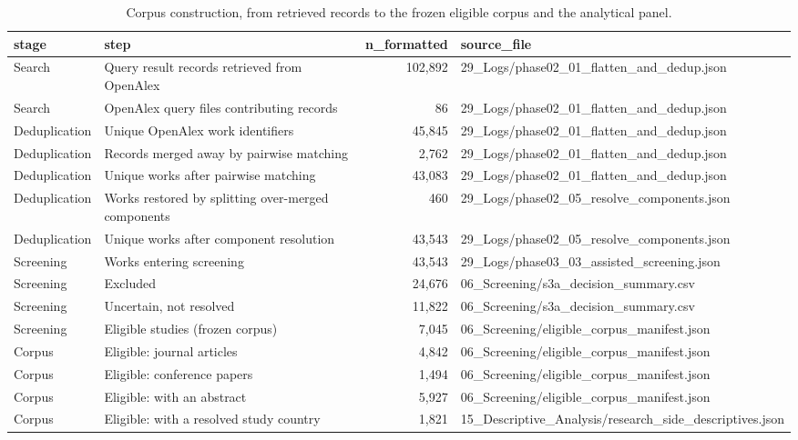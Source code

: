 \begin{table}[htbp]
\centering
\small
\caption{Corpus construction, from retrieved records to the frozen eligible corpus and the analytical panel.}
\label{tab:tab_01_corpus_construction}
\begin{tabular}{llrl}
\toprule
stage & step & n\_formatted & source\_file \\
\midrule
Search & Query result records retrieved from OpenAlex & 102,892 & 29\_Logs/phase02\_01\_flatten\_and\_dedup.json \\
Search & OpenAlex query files contributing records & 86 & 29\_Logs/phase02\_01\_flatten\_and\_dedup.json \\
Deduplication & Unique OpenAlex work identifiers & 45,845 & 29\_Logs/phase02\_01\_flatten\_and\_dedup.json \\
Deduplication & Records merged away by pairwise matching & 2,762 & 29\_Logs/phase02\_01\_flatten\_and\_dedup.json \\
Deduplication & Unique works after pairwise matching & 43,083 & 29\_Logs/phase02\_01\_flatten\_and\_dedup.json \\
Deduplication & Works restored by splitting over-merged components & 460 & 29\_Logs/phase02\_05\_resolve\_components.json \\
Deduplication & Unique works after component resolution & 43,543 & 29\_Logs/phase02\_05\_resolve\_components.json \\
Screening & Works entering screening & 43,543 & 29\_Logs/phase03\_03\_assisted\_screening.json \\
Screening & Excluded & 24,676 & 06\_Screening/s3a\_decision\_summary.csv \\
Screening & Uncertain, not resolved & 11,822 & 06\_Screening/s3a\_decision\_summary.csv \\
Screening & Eligible studies (frozen corpus) & 7,045 & 06\_Screening/eligible\_corpus\_manifest.json \\
Corpus & Eligible: journal articles & 4,842 & 06\_Screening/eligible\_corpus\_manifest.json \\
Corpus & Eligible: conference papers & 1,494 & 06\_Screening/eligible\_corpus\_manifest.json \\
Corpus & Eligible: with an abstract & 5,927 & 06\_Screening/eligible\_corpus\_manifest.json \\
Corpus & Eligible: with a resolved study country & 1,821 & 15\_Descriptive\_Analysis/research\_side\_descriptives.json \\

\end{tabular}
\end{table}

